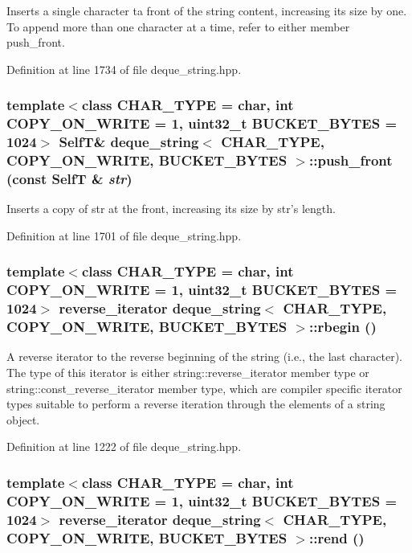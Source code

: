 Inserts a single character ta front of the string content, increasing its size by one. To append more than one character at a time, refer to either member push\_\-front. 

Definition at line 1734 of file deque\_\-string.hpp.\hypertarget{classdeque__string_466e757d7ca5a6f9680f00b56eb3cd22}{
\subsubsection[{push\_\-front}]{\setlength{\rightskip}{0pt plus 5cm}template$<$class CHAR\_\-TYPE  = char, int COPY\_\-ON\_\-WRITE = 1, uint32\_\-t BUCKET\_\-BYTES = 1024$>$ {\bf SelfT}\& {\bf deque\_\-string}$<$ CHAR\_\-TYPE, COPY\_\-ON\_\-WRITE, BUCKET\_\-BYTES $>$::push\_\-front (const {\bf SelfT} \& {\em str})}}
\label{classdeque__string_466e757d7ca5a6f9680f00b56eb3cd22}


Inserts a copy of str at the front, increasing its size by str's length. 

Definition at line 1701 of file deque\_\-string.hpp.\hypertarget{classdeque__string_372ecdc953661796143d9c7cb4dde563}{
\subsubsection[{rbegin}]{\setlength{\rightskip}{0pt plus 5cm}template$<$class CHAR\_\-TYPE  = char, int COPY\_\-ON\_\-WRITE = 1, uint32\_\-t BUCKET\_\-BYTES = 1024$>$ reverse\_\-iterator {\bf deque\_\-string}$<$ CHAR\_\-TYPE, COPY\_\-ON\_\-WRITE, BUCKET\_\-BYTES $>$::rbegin ()}}
\label{classdeque__string_372ecdc953661796143d9c7cb4dde563}


A reverse iterator to the reverse beginning of the string (i.e., the last character). The type of this iterator is either string::reverse\_\-iterator member type or string::const\_\-reverse\_\-iterator member type, which are compiler specific iterator types suitable to perform a reverse iteration through the elements of a string object. 

Definition at line 1222 of file deque\_\-string.hpp.\hypertarget{classdeque__string_6816bb979aae4999ef6076889047be04}{
\subsubsection[{rend}]{\setlength{\rightskip}{0pt plus 5cm}template$<$class CHAR\_\-TYPE  = char, int COPY\_\-ON\_\-WRITE = 1, uint32\_\-t BUCKET\_\-BYTES = 1024$>$ reverse\_\-iterator {\bf deque\_\-string}$<$ CHAR\_\-TYPE, COPY\_\-ON\_\-WRITE, BUCKET\_\-BYTES $>$::rend ()}}
\label{classdeque__string_6816bb979aae4999ef6076889047be04}



